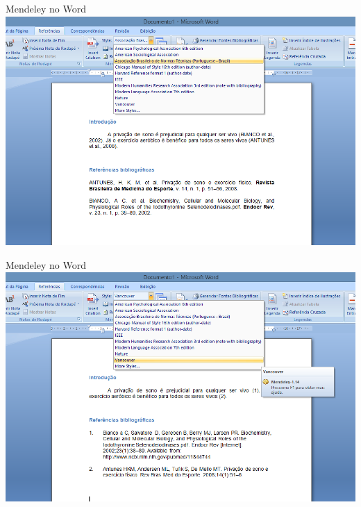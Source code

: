 \documentclass{beamer}
\begin{document}
\begin{frame}{Mendeley no Word}
  \centering
  \includegraphics[width=1.1\textwidth]{Referencias/mendeley-word-ABNT}
\end{frame}

\begin{frame}{Mendeley no Word}
  \centering
  \includegraphics[width=1.1\textwidth]{Referencias/mendeley-word-vancouver}
\end{frame}
\end{document}
